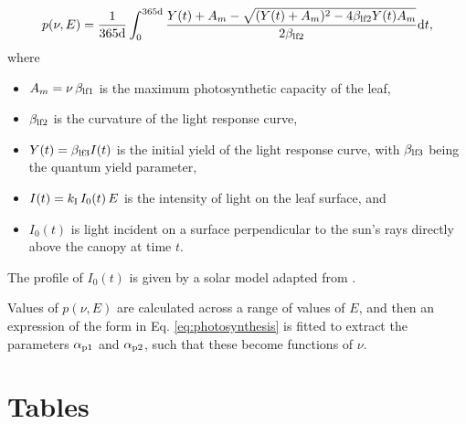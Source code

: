 \documentclass[10pt,twoside]{article}
\begin{document}
$$p(\nu, E) = \frac1{365 \textrm{d}}\int_0^{365 \textrm{d}}\frac{Y(t) + A_m - \sqrt{(Y(t) + A_m)^2 - 4 \beta_{{\rm lf2}} Y(t) A_m }}{2 \beta_{{\rm lf2}}} {\rm d}t,$$
where
\begin{itemize}
\item $A_m = \nu \, \beta_{{\rm lf1}}$ is the maximum photosynthetic capacity of the leaf,
\item $\beta_{{\rm lf2}}$ is the curvature of the light response curve,
\item $Y(t) = \beta_{{\rm lf3}} I(t)$ is the initial yield of the light response curve, with $\beta_{{\rm lf3}}$ being the quantum yield parameter,
\item $I(t) = k_{\rm I} \, I_0(t)\, E$ is the intensity of light on the leaf surface, and
\item $I_0(t)$ is light incident on a surface perpendicular to the sun's rays directly above the canopy at time $t$.
\end{itemize}
The profile of $I_0(t)$ is given by a solar model adapted from \citet{TerSteege-1997}.

Values of $p(\nu, E)$ are calculated across a range of values of $E$, and then an expression of the form in Eq. \ref{eq:photosynthesis} is fitted to extract the parameters
$\alpha_{{\rm p1}}$ and $\alpha_{{\rm p2}}$, such that these become functions of $\nu$.

\clearpage

\section{Tables}\label{tables}
\end{document}

